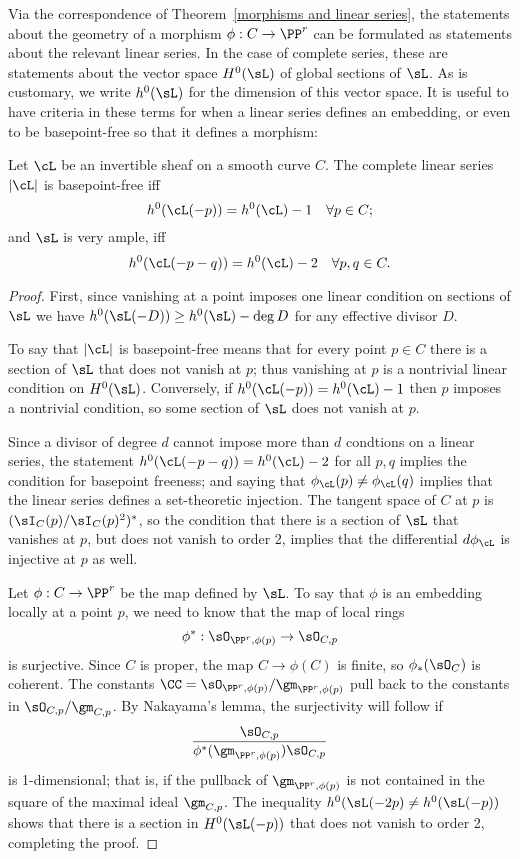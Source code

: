 Via the correspondence of Theorem~\ref{morphisms and linear series}, the statements about the geometry of a morphism $\phi : C \to \PP^r$ can be formulated as statements about the relevant linear series. In the case of complete series, these are statements about the vector space $H^{0}(\sL)$ of global sections of $\sL$. As is customary, we write $h^{0}(\sL)$ for the dimension of this vector space. It is useful to have criteria
in these terms for when a linear series defines an embedding, or even to be basepoint-free so that it
defines a morphism:

\begin{proposition}\label{very ample}\cite[Thm. IV.3.1]{H}
Let $\cL$ be an invertible sheaf on a smooth curve $C$. The complete linear series $|\cL|$ is basepoint-free iff
$$
h^0(\cL(-p)) = h^0(\cL) - 1 \quad \forall p \in C;
$$
and $\sL$ is very ample, iff
$$
h^0(\cL(-p-q)) = h^0(\cL) - 2 \quad \forall p, q \in C.
$$
\end{proposition} 

\begin{proof}
First, since vanishing at a point imposes one linear condition on sections of $\sL$ we have $h^0(\sL(-D)) \geq h^0(\sL)-\deg D$ for any
effective divisor $D$.

To say that $|\cL|$ is basepoint-free means that for every point $p\in C$ there is a section of $\sL$ that does not vanish at $p$; thus vanishing
at $p$ is a nontrivial linear condition on $H^0(\sL)$. Conversely, if $h^0(\cL(-p)) = h^0(\cL) - 1$ then $p$ imposes a nontrivial condition, so
some section of $\sL$ does not vanish at $p$.

Since a divisor of degree $d$ cannot impose more than $d$ condtions on a linear series, the statement $h^0(\cL(-p-q)) = h^0(\cL) - 2$ for all $p, q$ implies the condition for basepoint freeness; and saying that $\phi_\cL(p) \neq \phi_\cL(q)$ implies that the linear series defines a set-theoretic injection. The tangent space of $C$ at $p$ is $(\sI_C(p)/\sI_C(p)^2)^*$, so the condition that there is a section of $\sL$ that vanishes at $p$, but does not vanish
to order 2, implies that the differential $d\phi_\cL$ is injective at $p$ as well.

Let $\phi:C \to \PP^r$ be the map defined by $\sL$. To say that $\phi$  is an embedding locally at a point $p$, we need to know that the map of local rings
$$
\phi^*: \sO_{\PP^r,\phi(p)} \to \sO_{C,p} 
$$
is surjective. Since $C$ is proper, the map $C\to \phi(C)$ is finite,
so $\phi_*(\sO_{C})$ is coherent.%
 The constants  $\CC =\sO_{\PP^r,\phi(p)}/\gm_{\PP^r,\phi(p)}$ pull back to the constants in
$\sO_{C,p}/\gm_{C,p}$. 
By Nakayama's lemma, the surjectivity will follow if 
$$
\frac{\sO_{C,p}}
{\phi^*(\gm_{\PP^r,\phi(p)})  \sO_{C,p}}
$$
is 1-dimensional; that is, if  the pullback of $\gm_{\PP^r,\phi(p)}$ is not contained in the square of the
maximal ideal $\gm_{C,p}$. The inequality $h^0(\sL(-2p) \neq h^0(\sL(-p))$ shows that there is a 
section in $H^0(\sL(-p))$ that does not vanish to order 2, completing the proof.
\end{proof}


